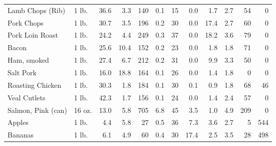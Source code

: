 \documentclass[
  ignorenonframetext,
]{beamer}
\begin{document}
\begin{frame}[fragile]
\begin{tabular}{llrrrrrrrrrr}
Lamb Chops (Rib)        &       1 lb. &                36.6 &       3.3 &          140 &          0.1 &         15 &             0.0 &            1.7 &              2.7 &           54 &                   0 \\
Pork Chops              &       1 lb. &                30.7 &       3.5 &          196 &          0.2 &         30 &             0.0 &           17.4 &              2.7 &           60 &                   0 \\
Pork Loin Roast         &       1 lb. &                24.2 &       4.4 &          249 &          0.3 &         37 &             0.0 &           18.2 &              3.6 &           79 &                   0 \\
Bacon                   &       1 lb. &                25.6 &      10.4 &          152 &          0.2 &         23 &             0.0 &            1.8 &              1.8 &           71 &                   0 \\
Ham, smoked             &       1 lb. &                27.4 &       6.7 &          212 &          0.2 &         31 &             0.0 &            9.9 &              3.3 &           50 &                   0 \\
Salt Pork               &       1 lb. &                16.0 &      18.8 &          164 &          0.1 &         26 &             0.0 &            1.4 &              1.8 &            0 &                   0 \\
Roasting Chicken        &       1 lb. &                30.3 &       1.8 &          184 &          0.1 &         30 &             0.1 &            0.9 &              1.8 &           68 &                  46 \\
Veal Cutlets            &       1 lb. &                42.3 &       1.7 &          156 &          0.1 &         24 &             0.0 &            1.4 &              2.4 &           57 &                   0 \\
Salmon, Pink (can)      &      16 oz. &                13.0 &       5.8 &          705 &          6.8 &         45 &             3.5 &            1.0 &              4.9 &          209 &                   0 \\
Apples                  &       1 lb. &                 4.4 &       5.8 &           27 &          0.5 &         36 &             7.3 &            3.6 &              2.7 &            5 &                 544 \\
Bananas                 &       1 lb. &                 6.1 &       4.9 &           60 &          0.4 &         30 &            17.4 &            2.5 &              3.5 &           28 &                 498 \\

\end{tabular}
\end{frame}
\end{document}
